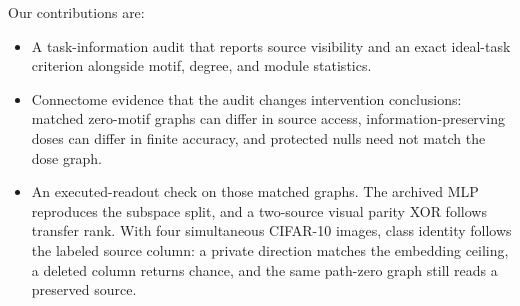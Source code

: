 Our contributions are:
\begin{itemize}
  \item A task-information audit that reports source visibility and an exact
        ideal-task criterion alongside motif, degree, and module statistics.
  \item Connectome evidence that the audit changes intervention conclusions:
        matched zero-motif graphs can differ in source access, information-preserving
        doses can differ in finite accuracy, and protected nulls need not match
        the dose graph.
  \item An executed-readout check on those matched graphs. The archived MLP
        reproduces the subspace split, and a two-source visual parity XOR
        follows transfer rank. With four simultaneous CIFAR-10 images, class
        identity follows the labeled source column: a private direction matches
        the embedding ceiling, a deleted column returns chance, and the same
        path-zero graph still reads a preserved source.
\end{itemize}
